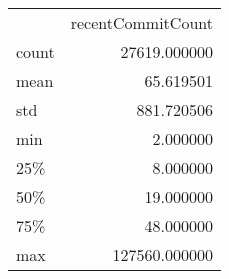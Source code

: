 \begin{tabular}{lr}
 & recentCommitCount \\
count & 27619.000000 \\
mean & 65.619501 \\
std & 881.720506 \\
min & 2.000000 \\
25\% & 8.000000 \\
50\% & 19.000000 \\
75\% & 48.000000 \\
max & 127560.000000 \\
\end{tabular}
